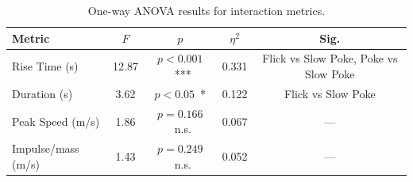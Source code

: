 \begin{table}[h]
\centering
\caption{One-way ANOVA results for interaction metrics.}
\label{tab:anova}
\begin{tabular}{lcccc}
\hline
Metric & $F$ & $p$ & $\eta^2$ & Sig. \\
\hline
Rise Time (s) & 12.87 & $p < 0.001$~*** & 0.331 & Flick vs Slow Poke, Poke vs Slow Poke \\
Duration (s) & 3.62 & $p < 0.05$~* & 0.122 & Flick vs Slow Poke \\
Peak Speed (m/s) & 1.86 & $p = 0.166$~n.s. & 0.067 & — \\
Impulse/mass (m/s) & 1.43 & $p = 0.249$~n.s. & 0.052 & — \\
\hline
\end{tabular}
\end{table}